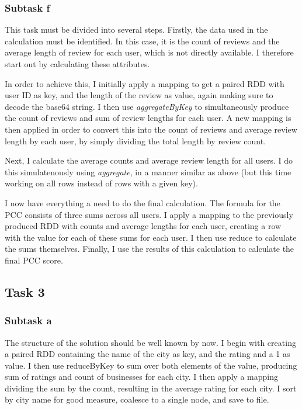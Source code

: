 \documentclass[a4paper]{article}
\begin{document}
\subsubsection{Subtask f}
This task must be divided into several steps. Firstly, the data used in the calculation must be identified. In this case, it is the count of reviews and the average length of review for each user, which is not directly available. I therefore start out by calculating these attributes.

In order to achieve this, I initially apply a mapping to get a paired RDD with user ID as key, and the length of the review as value, again making sure to decode the base64 string. I then use \emph{aggregateByKey} to simultaneously produce the count of reviews and sum of review lengths for each user. A new mapping is then applied in order to convert this into the count of reviews and average review length by each user, by simply dividing the total length by review count.

Next, I calculate the average counts and average review length for all users. I do this simulatenously using \emph{aggregate}, in a manner similar as above (but this time working on all rows instead of rows with a given key).

I now have everything a need to do the final calculation. The formula for the PCC consists of three sums across all users. I apply a mapping to the previously produced RDD with counts and average lengths for each user, creating a row with the value for each of these sums for each user. I then use reduce to calculate the sums themselves. Finally, I use the results of this calculation to calculate the final PCC score.


\subsection{Task 3}

\subsubsection{Subtask a}
The structure of the solution should be well known by now. I begin with creating a paired RDD containing the name of the city as key, and the rating and a 1 as value. I then use reduceByKey to sum over both elements of the value, producing sum of ratings and count of businesses for each city. I then apply a mapping dividing the sum by the count, resulting in the average rating for each city. I sort by city name for good measure, coalesce to a single node, and save to file.
\end{document}
